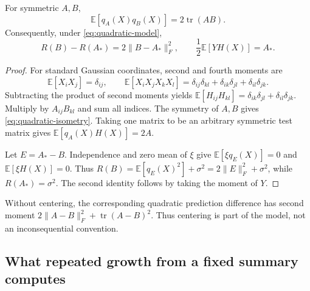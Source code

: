 \begin{theorem}
\label{thm:quadratic-geometry}
For symmetric $A,B$,
\begin{equation}
 \mathbb E[q_A(X)q_B(X)]=2\operatorname{tr}(AB).
 \label{eq:quadratic-isometry}
\end{equation}
Consequently, under \eqref{eq:quadratic-model},
\begin{equation}
 R(B)-R(A_*)=2\|B-A_*\|_F^2,
 \qquad \frac12\mathbb E[YH(X)]=A_*.
 \label{eq:quadratic-risk-moment}
\end{equation}
\end{theorem}
\begin{proof}
For standard Gaussian coordinates, second and fourth moments are
\[
 \mathbb E[X_iX_j]=\delta_{ij},\qquad
 \mathbb E[X_iX_jX_kX_l]
 =\delta_{ij}\delta_{kl}+\delta_{ik}\delta_{jl}
  +\delta_{il}\delta_{jk}.
\]
Subtracting the product of second moments yields
$\mathbb E[H_{ij}H_{kl}]=\delta_{ik}\delta_{jl}
+\delta_{il}\delta_{jk}$. Multiply by $A_{ij}B_{kl}$ and sum all indices.
The symmetry of $A,B$ gives \eqref{eq:quadratic-isometry}. Taking one
matrix to be an arbitrary symmetric test matrix gives
$\mathbb E[q_A(X)H(X)]=2A$.

Let $E=A_*-B$. Independence and zero mean of $\xi$ give
$\mathbb E[\xi q_E(X)]=0$ and $\mathbb E[\xi H(X)]=0$.
Thus $R(B)=\mathbb E[q_E(X)^2]+\sigma^2
=2\|E\|_F^2+\sigma^2$, while $R(A_*)=\sigma^2$.
The second identity follows by taking the moment of $Y$.
\end{proof}

Without centering, the corresponding quadratic prediction difference has
second moment $2\|A-B\|_F^2+\operatorname{tr}(A-B)^2$.
Thus centering is part of the model, not an inconsequential convention.

\subsection{What repeated growth from a fixed summary computes}

